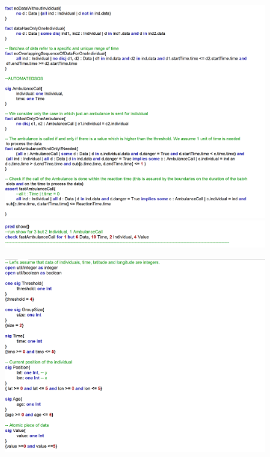 \documentclass{article}
\begin{document}
\begin{legal}
\begin{figure}[H]
		\end{figure}
		\begin{figure}[H]
			\includegraphics[width=\linewidth]{../images/alloy/code/automated_2.PNG}
			\includegraphics[width=\linewidth]{../images/alloy/code/automated_3.PNG}
		\end{figure}
		\begin{figure}[H]
			\newpage
			\includegraphics[width=\linewidth]{../images/alloy/code/data4Help_1.PNG}

\end{figure}
\end{legal}
\end{document}
